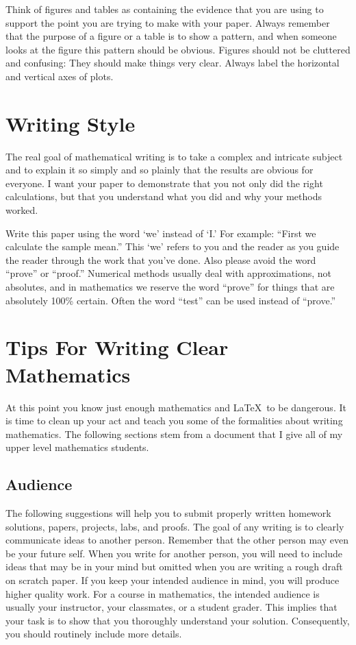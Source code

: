Think of figures and tables as containing the evidence that you are using to support the
point you are trying to make with your paper. Always remember that the purpose of a figure
or a table is to show a pattern, and when someone looks at the figure this pattern should
be obvious. Figures should not be cluttered and confusing: They should make things very
clear. Always label the horizontal and vertical axes of plots.

\section{Writing Style}
The real goal of mathematical writing is to take a complex and intricate subject and to
explain it so simply and so plainly that the results are obvious for everyone. I want your
paper to demonstrate that you not only did the right calculations, but that you understand
what you did and why your methods worked.

Write this paper using the word `we' instead of `I.' For example: ``First we calculate the
sample mean.'' This `we' refers to you and the reader as you guide the reader through the
work that you've done. Also please avoid the word ``prove'' or ``proof.'' Numerical methods
usually deal with approximations, not absolutes, and in mathematics we reserve the word
``prove'' for things that are absolutely 100\% certain. Often the word ``test'' can be used
instead of ``prove.''



\section{Tips For Writing Clear Mathematics}
At this point you know just enough mathematics and \LaTeX\ to be dangerous.  It is time to
clean up your act and teach you some of the formalities about writing mathematics.  The
following sections stem from a document that I give all of my upper level mathematics
students.  



\subsection{Audience}
The following suggestions will help you to submit properly written homework solutions,
papers, projects, labs, and proofs. The goal of any writing is to clearly communicate
ideas to another person. Remember that the other person may even be your future self. When
you write for another person, you will need to include ideas that may be in your mind but
omitted when you are writing a rough draft on scratch paper. If you keep your intended
audience in mind, you will produce higher quality work. For a course in mathematics, the
intended audience is usually your instructor, your classmates, or a student grader. This
implies that your task is to show that you thoroughly understand your solution.
Consequently, you should routinely include more details.


